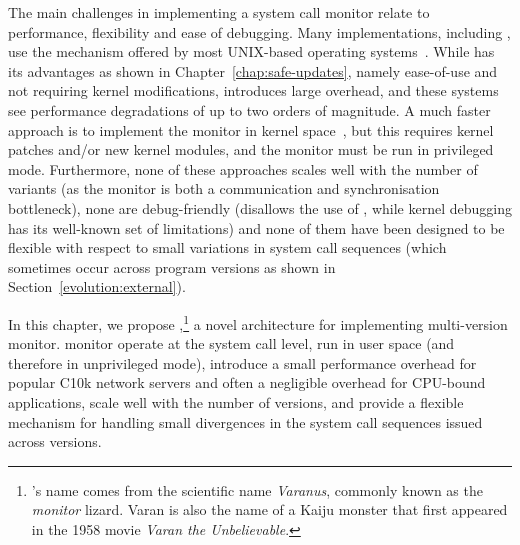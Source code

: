 
The main challenges in implementing a system call monitor relate to
performance, flexibility and ease of debugging.  Many implementations,
including \mx, use the \ptrace mechanism offered by most UNIX-based operating
systems~\cite{orchestra09,mx,process-replicae07}.  While \ptrace has its
advantages as shown in Chapter~\ref{chap:safe-updates}, namely ease-of-use and
not requiring kernel modifications, \ptrace introduces large overhead, and
these systems see performance degradations of up to two orders of magnitude.  A
much faster approach is to implement the monitor in kernel
space~\cite{cox2006}, but this requires kernel patches and/or new kernel
modules, and the monitor must be run in privileged mode.  Furthermore, none of
these approaches scales well with the number of variants (as the monitor is
both a communication and synchronisation bottleneck), none are debug-friendly
(\ptrace disallows the use of \gdb, while kernel debugging has its well-known
set of limitations) and none of them have been designed to be flexible with
respect to small variations in system call sequences (which sometimes occur
across program versions as shown in Section~\ref{evolution:external}).

In this chapter, we propose \varan,\footnote{\varan's name comes from
  the scientific name \emph{Varanus}, commonly known as the
  \emph{monitor} lizard. Varan is also the name of a Kaiju monster
  that first appeared in the 1958 movie \emph{Varan the
    Unbelievable}.} a novel architecture for implementing multi-version
monitor.  \varan monitor operate at the system call level, run in
user space (and therefore in unprivileged mode), introduce a small
performance overhead for popular C10k network servers and often a
negligible overhead for CPU-bound applications, scale well with the
number of versions, and provide a flexible mechanism for handling small
divergences in the system call sequences issued across versions.







